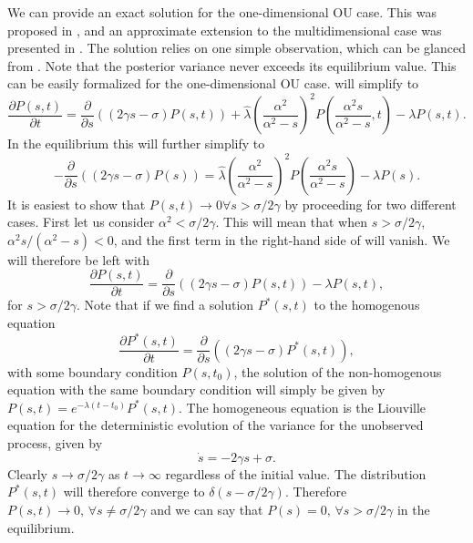 We can provide an exact solution for the one-dimensional OU case. This was proposed in \citep{Susemihl2011a}, and an approximate extension to the multidimensional case was presented in \citep{Susemihl2012a}. The solution relies on one simple observation, which can be glanced from . Note that the posterior variance never exceeds its equilibrium value. This can be easily formalized for the one-dimensional OU case.  will simplify to
\begin{equation}
\frac{\partial P(s,t)}{\partial t} = \frac{\partial}{\partial s} \left((2\gamma s - \sigma) P(s,t) \right) + \hat{\lambda} \left(\frac{\alpha^2}{\alpha^2-s} \right)^2 P\left(\frac{\alpha^2s}{\alpha^2-s},t\right) - \lambda P(s,t).
\end{equation}
In the equilibrium this will further simplify to
\begin{equation}
\label{eq:eq_dist_sigma_1d}
-\frac{\partial}{\partial s} \left((2\gamma s - \sigma) P(s) \right) =\hat{\lambda} \left(\frac{\alpha^2}{\alpha^2-s} \right)^2 P\left(\frac{\alpha^2s}{\alpha^2-s}\right) - \lambda P(s).
\end{equation}
It is easiest to show that $P(s,t) \to 0 \forall s > \sigma/2\gamma$ by proceeding for two different cases. First let us consider $\alpha^2 < \sigma/2\gamma$. This will mean that when $s > \sigma/2\gamma$, $\alpha^2s / (\alpha^2-s)<0$, and the first term in the right-hand side of  will vanish. We will therefore be left with
\[
\frac{\partial P(s,t)}{\partial t}= \frac{\partial}{\partial s} \left((2\gamma s - \sigma) P(s,t) \right)- \lambda P(s,t),
\]
for $s>\sigma/2\gamma$.
Note that if we find a solution $P^*(s,t)$ to the homogenous equation
\[
\frac{\partial P^*(s,t)}{\partial t}= \frac{\partial}{\partial s} \left((2\gamma s - \sigma) P^*(s,t) \right),
\]
with some boundary condition $P(s,t_0)$, the solution of the non-homogenous equation with the same boundary condition will simply be given by $P(s,t) = e^{-\lambda (t-t_0)} P^*(s,t)$. The homogeneous equation is the Liouville equation for the deterministic evolution of the variance for the unobserved process, given by
\[
\dot{s} = -2\gamma s + \sigma.
\]
Clearly $s \to \sigma/2\gamma$ as $t\to \infty$ regardless of the initial value. The distribution $P^*(s,t)$ will therefore converge to $\delta( s - \sigma/2\gamma)$. Therefore $P(s,t) \to 0,\, \forall s \neq \sigma/2\gamma$ and we can say that $P(s) = 0, \, \forall s > \sigma/2\gamma$ in the equilibrium.\par

